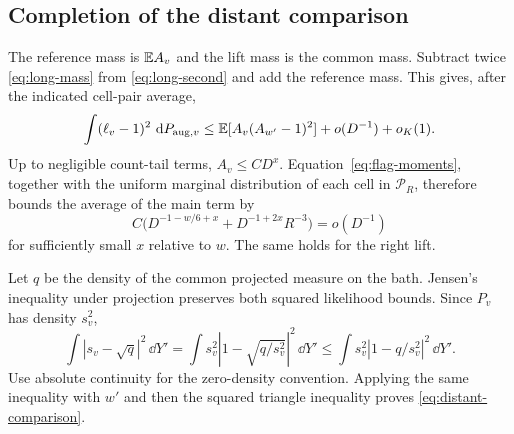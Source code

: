 \subsection{Completion of the distant comparison}

The reference mass is $\mathbb E A_v$ and the lift mass is the common
mass.  Subtract twice \eqref{eq:long-mass} from
\eqref{eq:long-second} and add the reference mass.  This gives,
after the indicated cell-pair average,
\begin{equation}\label{eq:long-likelihood-error}
 \int(\ell_v-1)^2\,\,\mathrm d P_{{\rm aug},v}
 \le \mathbb E[A_v(A_{w'}-1)^2]+o(D^{-1})+o_K(1).
\end{equation}
Up to negligible count-tail terms, $A_v\le CD^x$.
Equation~\eqref{eq:flag-moments}, together with the uniform
marginal distribution of each cell in $\mathcal P_R$, therefore
bounds the average of the main term by
\[
 C\bigl(D^{-1-w/6+x}+D^{-1+2x}R^{-3}\bigr)=o(D^{-1})
\]
for sufficiently small $x$ relative to $w$.  The same holds for
the right lift.

Let $q$ be the density of the common projected measure on the
bath.  Jensen's inequality under projection preserves both
squared likelihood bounds.  Since $P_v$ has density $s_v^2$,
\[
 \int|s_v-\sqrt q|^2\,\dd Y'
 =\int s_v^2\left|1-\sqrt{q/s_v^2}\right|^2\,\dd Y'
 \le\int s_v^2|1-q/s_v^2|^2\,\dd Y'.
\]
Use absolute continuity for the zero-density convention.
Applying the same inequality with $w'$ and then the squared
triangle inequality proves \eqref{eq:distant-comparison}.
